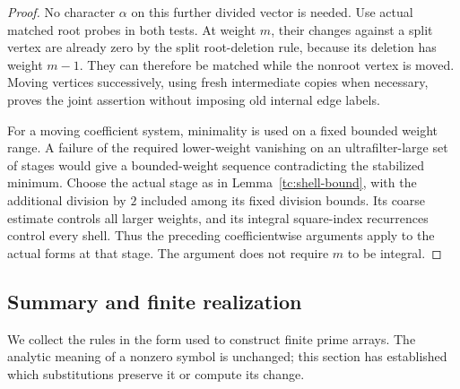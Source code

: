 \begin{proof}
No character $\alpha$ on this further divided vector is
needed.  Use actual matched root probes in both tests.  At
weight $m$, their changes against a split vertex are already
zero by the split root-deletion rule, because its deletion
has weight $m-1$.  They can therefore be matched while the
nonroot vertex is moved.  Moving vertices successively,
using fresh intermediate copies when necessary, proves the
joint assertion without imposing old internal edge labels.

For a moving coefficient system, minimality is used on a fixed bounded
weight range. A failure of the required lower-weight vanishing on an
ultrafilter-large set of stages would give a bounded-weight sequence
contradicting the stabilized minimum. Choose the actual stage as in
Lemma~\ref{tc:shell-bound}, with the additional division by $2$ included
among its fixed division bounds. Its coarse estimate controls all larger
weights, and its integral square-index recurrences control every shell.
Thus the preceding coefficientwise arguments apply to the actual forms
at that stage. The argument does not require $m$ to be integral.
\end{proof}

\subsection{Summary and finite realization}

We collect the rules in the form used to construct finite prime arrays.
The analytic meaning of a nonzero symbol is unchanged; this section has
established which substitutions preserve it or compute its change.

